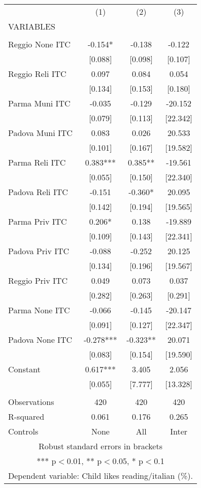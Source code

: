 \begin{tabular}{lccc} \hline
 & (1) & (2) & (3) \\
VARIABLES &  &  &  \\ \hline
 &  &  &  \\
Reggio None ITC & -0.154* & -0.138 & -0.122 \\
 & [0.088] & [0.098] & [0.107] \\
Reggio Reli ITC & 0.097 & 0.084 & 0.054 \\
 & [0.134] & [0.153] & [0.180] \\
Parma Muni ITC & -0.035 & -0.129 & -20.152 \\
 & [0.079] & [0.113] & [22.342] \\
Padova Muni ITC & 0.083 & 0.026 & 20.533 \\
 & [0.101] & [0.167] & [19.582] \\
Parma Reli ITC & 0.383*** & 0.385** & -19.561 \\
 & [0.055] & [0.150] & [22.340] \\
Padova Reli ITC & -0.151 & -0.360* & 20.095 \\
 & [0.142] & [0.194] & [19.565] \\
Parma Priv ITC & 0.206* & 0.138 & -19.889 \\
 & [0.109] & [0.143] & [22.341] \\
Padova Priv ITC & -0.088 & -0.252 & 20.125 \\
 & [0.134] & [0.196] & [19.567] \\
Reggio Priv ITC & 0.049 & 0.073 & 0.037 \\
 & [0.282] & [0.263] & [0.291] \\
Parma None ITC & -0.066 & -0.145 & -20.147 \\
 & [0.091] & [0.127] & [22.347] \\
Padova None ITC & -0.278*** & -0.323** & 20.071 \\
 & [0.083] & [0.154] & [19.590] \\
Constant & 0.617*** & 3.405 & 2.056 \\
 & [0.055] & [7.777] & [13.328] \\
 &  &  &  \\
Observations & 420 & 420 & 420 \\
R-squared & 0.061 & 0.176 & 0.265 \\
 Controls & None & All & Inter \\ \hline
\multicolumn{4}{c}{ Robust standard errors in brackets} \\
\multicolumn{4}{c}{ *** p$<$0.01, ** p$<$0.05, * p$<$0.1} \\
\multicolumn{4}{c}{ Dependent variable: Child likes reading/italian (\%).} \\
\end{tabular}
